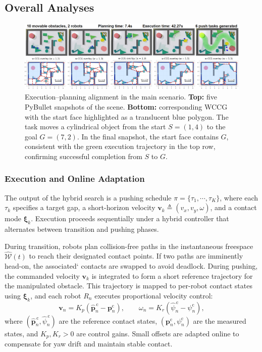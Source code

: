 \subsection{Overall Analyses}\label{subsec:overall}
\begin{figure}[t!]
  \centering
  \includegraphics[width=0.95\linewidth]{figures/sim_exp.png}
  \vspace{-2mm}
\caption{Execution--planning alignment in the main scenario. 
\textbf{Top:} five PyBullet snapshots of the scene. 
\textbf{Bottom:} corresponding WCCG with the start face highlighted as a translucent blue polygon.
The task moves a cylindrical object from the start \(S=(1,4)\) to the goal \(G=(7,2)\). 
In the final snapshot, the start face contains \(G\), 
consistent with the green execution trajectory in the top row, 
confirming successful completion from \(S\) to \(G\). 
}
 \vspace{-4mm}
\end{figure}


\subsubsection{Execution and Online Adaptation}\label{subsec:execute}
The output of the hybrid search is a pushing schedule
$\pi=\{\tau_1,\cdots,\tau_K\}$, where each $\tau_k$ specifies a target gap, a
short-horizon velocity $\mathbf{v}_k\triangleq(v_x,v_y,\omega)$, and a contact
mode $\boldsymbol{\xi}_k$. Execution proceeds sequentially under a hybrid
controller that alternates between transition and pushing phases.

During transition, robots plan collision-free paths in the
instantaneous freespace $\widehat{\mathcal{W}}(t)$ to reach their designated
contact points. If two paths are imminently head-on, the associated`
contacts are swapped to avoid deadlock.
During pushing, the commanded velocity $\mathbf{v}_k$ is integrated to form a
short reference trajectory for the manipulated obstacle. This trajectory is
mapped to per-robot contact states using $\boldsymbol{\xi}_k$, and each robot
$R_n$ executes proportional velocity control:
\[
\mathbf{v}_n = K_{\!p}\!\left(\widehat{\mathbf{p}}^{\,\text{c}}_n - \mathbf{p}^{\text{c}}_n\right),
\qquad
\omega_n = K_{\!r}\!\left(\widehat{\psi}^{\,\text{c}}_n - \psi^{\text{c}}_n\right),
\]
where $(\widehat{\mathbf{p}}^{\,\text{c}}_n,\widehat{\psi}^{\,\text{c}}_n)$ are
the reference contact states, $(\mathbf{p}^{\text{c}}_n,\psi^{\text{c}}_n)$ are
the measured states, and $K_{\!p},K_{\!r}>0$ are control gains. Small offsets
are adapted online to compensate for yaw drift and maintain stable contact.

